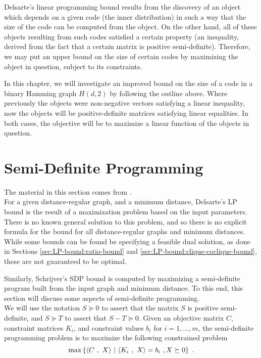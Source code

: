 \documentclass{report}
\begin{document}
  Delsarte's linear programming bound results from the discovery of an object
  which depends on a given code (the inner distribution) in such a way that the
  size of the code can be computed from the object.  On the other hand, all of
  these objects resulting from such codes satisfied a certain property (an
  inequality, derived from the fact that a certain matrix is positive
  semi-definite).  Therefore, we may put an upper bound on the size of certain
  codes by maximizing the object in question, subject to its constraints.

  In this chapter, we will investigate an improved bound on the size of a code
  in a binary Hamming graph $H(d, 2)$ by following the outline above.  Where
  previously the objects were non-negative vectors satisfying a linear
  inequality, now the objects will be positive-definite matrices satisfying
  linear equalities.  In both cases, the objective will be to maximize a linear
  function of the objects in question.

  \section{Semi-Definite Programming}\label{sec:SDP-bound:SDP}

    The material in this section comes from \cite{ocw}.
    \\

    For a given distance-regular graph, and a minimum distance, Delsarte's LP
    bound is the result of a maximization problem based on the input parameters.
    There is no known general solution to this problem, and so there is no
    explicit formula for the bound for all distance-regular graphs and minimum
    distances.  While some bounds can be found be specifying a feasible dual
    solution, as done in Sections \ref{sec:LP-bound:ratio-bound} and
    \ref{sec:LP-bound:clique-coclique-bound}, these are not guaranteed to be
    optimal.

    Similarly, Schrijver's SDP bound is computed by maximizing a semi-definite
    program built from the input graph and minimum distance.  To this end, this
    section will discuss some aspects of semi-definite programming.
    \\

    We will use the notation $S \succeq 0$ to assert that the matrix $S$ is
    positive semi-definite, and $S \succeq T$ to assert that $S - T \succeq 0$.
    Given an objective matrix $C$, constraint matrices $K_i$, and constraint
    values $b_i$ for $i = 1, \ldots, m$, the semi-definite programming problem
    is to maximize the following constrained problem
    $$
      \max\left\lbrace  \left\langle  C \ , \ X  \right\rangle \ \middle| \ 
        \left\langle  K_i \ , \ X  \right\rangle = b_i \ ,
        X \succeq 0
        \right\rbrace \ .
    $$
\end{document}
